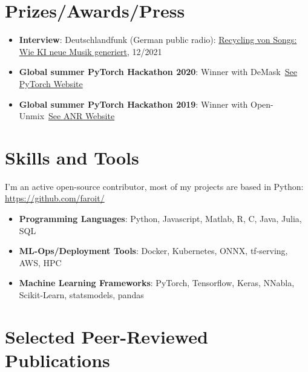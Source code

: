 \documentclass[a4paper,11pt]{article}
\newcommand{\resumeItem}[2]{
  \item\small{
    \textbf{#1}{: #2 \vspace{-2pt}}
  }
}
\newcommand{\resumeSubItem}[2]{\resumeItem{#1}{#2}\vspace{-4pt}}
\newcommand{\resumeSubHeadingListStart}{\begin{itemize}[leftmargin=*]}
\newcommand{\resumeSubHeadingListEnd}{\end{itemize}}
\begin{document}
\section{Prizes/Awards/Press}
\resumeSubHeadingListStart
    \resumeSubItem{Interview}{Deutschlandfunk (German public radio): \href{https://www.deutschlandfunkkultur.de/recycling-von-songs-wie-ki-neue-musik-generiert-dlf-kultur-90e01124-100.html}{Recycling von Songs: Wie KI neue Musik generiert}, 12/2021}
    \resumeSubItem{Global summer PyTorch Hackathon 2020}
        {Winner with DeMask~\href{https://pytorch.org/blog/announcing-the-winners-of-the-2020-global-pytorch-summer-hackathon/}{See PyTorch Website}}
    \resumeSubItem{Global summer PyTorch Hackathon 2019}
        {Winner with Open-Unmix~\href{https://anr.fr/fr/actualites-de-lanr/details/news/open-unmix-un-logiciel-open-source-issu-du-projet-anr-kamoulox-pour-demixer-la-musique/}{See ANR Website}}
\resumeSubHeadingListEnd

\section{Skills and Tools}
I'm an active open-source contributor, most of my projects are based in Python: \url{https://github.com/faroit/}
 \resumeSubHeadingListStart
   \resumeSubItem{Programming Languages}
     {Python, Javascript, Matlab, R, C, Java, Julia, SQL}
   \resumeSubItem{ML-Ops/Deployment Tools}
     {Docker, Kubernetes, ONNX, tf-serving, AWS, HPC}
   \resumeSubItem{Machine Learning Frameworks}
     {PyTorch, Tensorflow, Keras, NNabla, Scikit-Learn, statsmodels, pandas}
     \resumeSubHeadingListEnd
     
\section{Selected Peer-Reviewed Publications}
\end{document}
